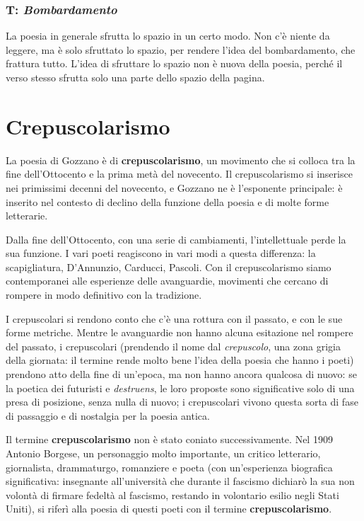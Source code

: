 \subsection{T: \textit{Bombardamento}}

La poesia in generale sfrutta lo spazio in un certo modo. Non c’è niente da leggere, ma è solo sfruttato lo spazio, per rendere l’idea del bombardamento, che frattura tutto.
L’idea di sfruttare lo spazio non è nuova della poesia, perché il verso stesso sfrutta solo una parte dello spazio della pagina.

\chapter{Crepuscolarismo}

La poesia di Gozzano è di \textbf{crepuscolarismo}, un movimento che si colloca tra la fine dell’Ottocento e la prima metà del novecento.
Il crepuscolarismo si inserisce nei primissimi decenni del novecento, e Gozzano ne è l’esponente principale: è inserito nel contesto di declino della funzione della poesia e di molte forme letterarie.

Dalla fine dell’Ottocento, con una serie di cambiamenti, l’intellettuale perde la sua funzione. I vari poeti reagiscono in vari modi a questa differenza: la scapigliatura, D’Annunzio, Carducci, Pascoli.
Con il crepuscolarismo siamo contemporanei alle esperienze delle avanguardie, movimenti che cercano di rompere in modo definitivo con la tradizione.

I crepuscolari si rendono conto che c’è una rottura con il passato, e con le sue forme metriche. Mentre le avanguardie non hanno alcuna esitazione nel rompere del passato, i crepuscolari (prendendo il nome dal \textit{crepuscolo}, una zona grigia della giornata: il termine rende molto bene l’idea della poesia che hanno i poeti) prendono atto della fine di un’epoca, ma non hanno ancora qualcosa di nuovo: se la poetica dei futuristi e \textit{destruens}, le loro proposte sono significative solo di una presa di posizione, senza nulla di nuovo; i crepuscolari vivono questa sorta di fase di passaggio e di nostalgia per la poesia antica.

Il termine \textbf{crepuscolarismo} non è stato coniato successivamente. Nel 1909 Antonio Borgese, un personaggio molto importante, un critico letterario, giornalista, drammaturgo, romanziere e poeta (con un’esperienza biografica significativa: insegnante all’università che durante il fascismo dichiarò la sua non volontà di firmare fedeltà al fascismo, restando in volontario esilio negli Stati Uniti), si riferì alla poesia di questi poeti con il termine \textbf{crepuscolarismo}.

